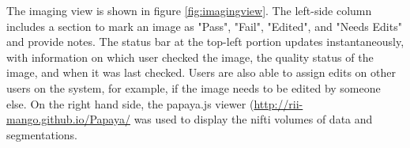 The imaging view is shown in figure \ref{fig:imagingview}. The left-side column includes a section to mark an image as "Pass", "Fail", "Edited", and "Needs Edits" and provide notes. The status bar at the top-left portion updates instantaneously, with information on which user checked the image, the quality status of the image, and when it was last checked. Users are also able to assign edits on other users on the system, for example, if the image needs to be edited by someone else. On the right hand side, the papaya.js viewer (\href{http://rii-mango.github.io/Papaya/}{http://rii-mango.github.io/Papaya/} was used to display the nifti volumes of data and segmentations.

